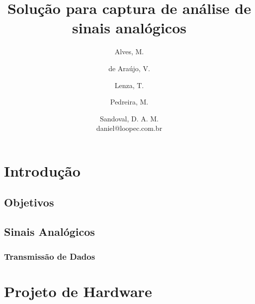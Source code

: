 \documentclass[12pt,a4paper]{report}
\title{Solução para captura de análise de sinais analógicos}
\author{Alves, M.\\
	\and
	de Araújo, V.\\
	\and
	Lenza, T.\\
	\and
	Pedreira, M.\\
	\and
	Sandoval, D. A. M.\\
	daniel@loopec.com.br}
\begin{document}
\maketitle
\tableofcontents

\chapter{Introdução}


\section{Objetivos}


\section{Sinais Analógicos}


\subsection{Transmissão de Dados}


\chapter{Projeto de Hardware}


\end{document}

